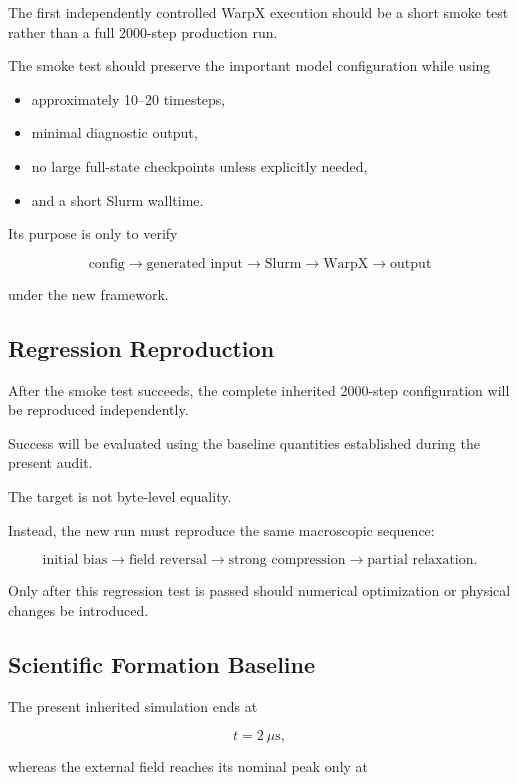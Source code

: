 \documentclass[11pt,a4paper]{article}
\begin{document}
The first independently controlled WarpX execution should be a short smoke
test rather than a full 2000-step production run.

The smoke test should preserve the important model configuration while using

\begin{itemize}
    \item approximately 10--20 timesteps,
    \item minimal diagnostic output,
    \item no large full-state checkpoints unless explicitly needed,
    \item and a short Slurm walltime.
\end{itemize}

Its purpose is only to verify

\[
\text{config}
\rightarrow
\text{generated input}
\rightarrow
\text{Slurm}
\rightarrow
\text{WarpX}
\rightarrow
\text{output}
\]

under the new framework.


\subsection{Regression Reproduction}

After the smoke test succeeds, the complete inherited 2000-step configuration
will be reproduced independently.

Success will be evaluated using the baseline quantities established during
the present audit.

The target is not byte-level equality.

Instead, the new run must reproduce the same macroscopic sequence:

\[
\text{initial bias}
\rightarrow
\text{field reversal}
\rightarrow
\text{strong compression}
\rightarrow
\text{partial relaxation}.
\]

Only after this regression test is passed should numerical optimization or
physical changes be introduced.


\subsection{Scientific Formation Baseline}

The present inherited simulation ends at

\[
t=2~\mu\mathrm{s},
\]

whereas the external field reaches its nominal peak only at
\end{document}
